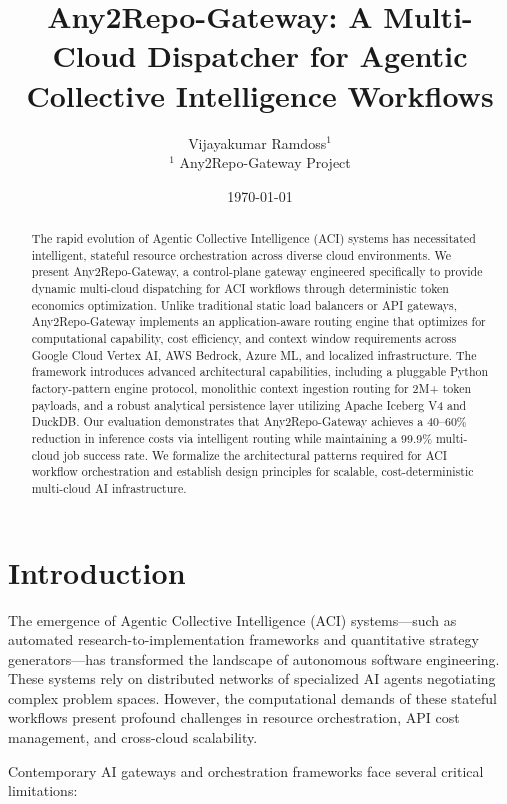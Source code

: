 \documentclass[10pt]{article}
\title{Any2Repo-Gateway: A Multi-Cloud Dispatcher for Agentic Collective Intelligence Workflows}
\author{
Vijayakumar Ramdoss$^{1}$ \\
\small $^{1}$ Any2Repo-Gateway Project
}
\date{\today}
\begin{document}
\maketitle

\begin{abstract}
The rapid evolution of Agentic Collective Intelligence (ACI) systems has necessitated intelligent, stateful resource orchestration across diverse cloud environments. We present Any2Repo-Gateway, a control-plane gateway engineered specifically to provide dynamic multi-cloud dispatching for ACI workflows through deterministic token economics optimization. Unlike traditional static load balancers or API gateways, Any2Repo-Gateway implements an application-aware routing engine that optimizes for computational capability, cost efficiency, and context window requirements across Google Cloud Vertex AI, AWS Bedrock, Azure ML, and localized infrastructure. The framework introduces advanced architectural capabilities, including a pluggable Python factory-pattern engine protocol, monolithic context ingestion routing for 2M+ token payloads, and a robust analytical persistence layer utilizing Apache Iceberg V4 and DuckDB. Our evaluation demonstrates that Any2Repo-Gateway achieves a 40--60\% reduction in inference costs via intelligent routing while maintaining a 99.9\% multi-cloud job success rate. We formalize the architectural patterns required for ACI workflow orchestration and establish design principles for scalable, cost-deterministic multi-cloud AI infrastructure.
\end{abstract}

\section{Introduction}

The emergence of Agentic Collective Intelligence (ACI) systems---such as automated research-to-implementation frameworks and quantitative strategy generators---has transformed the landscape of autonomous software engineering. These systems rely on distributed networks of specialized AI agents negotiating complex problem spaces. However, the computational demands of these stateful workflows present profound challenges in resource orchestration, API cost management, and cross-cloud scalability.

Contemporary AI gateways and orchestration frameworks face several critical limitations:
\end{document}
